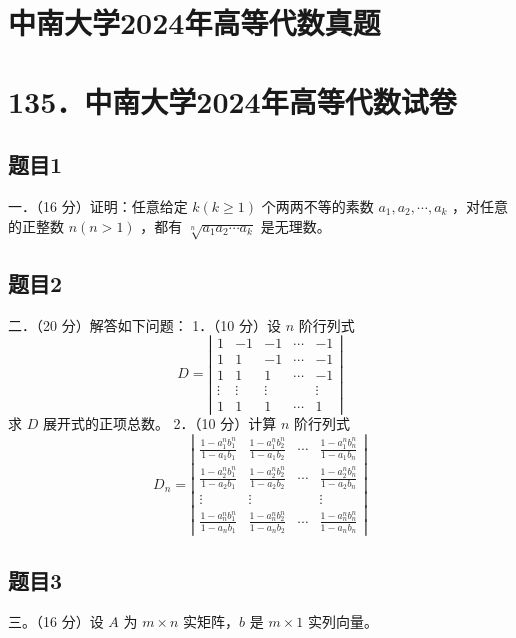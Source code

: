 \documentclass{article}
\begin{document}
\section*{中南大学2024年高等代数真题}
\section*{135．中南大学2024年高等代数试卷}

\subsection{题目1}
一．（16 分）证明：任意给定 \(k(k \geq 1)\) 个两两不等的素数 \(a_{1}, a_{2}, \cdots, a_{k}\) ，对任意的正整数 \(n(n>1)\) ，都有 \(\sqrt[n]{a_{1} a_{2} \cdots a_{k}}\) 是无理数。

\subsection{题目2}
二．（20 分）解答如下问题：
1．（10 分）设 \(n\) 阶行列式
\[
D=\left|\begin{array}{ccccc}
1 & -1 & -1 & \cdots & -1 \\
1 & 1 & -1 & \cdots & -1 \\
1 & 1 & 1 & \cdots & -1 \\
\vdots & \vdots & \vdots & & \vdots \\
1 & 1 & 1 & \cdots & 1
\end{array}\right|
\]
求 \(D\) 展开式的正项总数。
2．（10 分）计算 \(n\) 阶行列式
\[
D_{n}=\left|\begin{array}{cccc}
\frac{1-a_{1}^{n} b_{1}^{n}}{1-a_{1} b_{1}} & \frac{1-a_{1}^{n} b_{2}^{n}}{1-a_{1} b_{2}} & \cdots & \frac{1-a_{1}^{n} b_{n}^{n}}{1-a_{1} b_{n}} \\
\frac{1-a_{2}^{n} b_{1}^{n}}{1-a_{2} b_{1}} & \frac{1-a_{2}^{n} b_{2}^{n}}{1-a_{2} b_{2}} & \cdots & \frac{1-a_{2}^{n} b_{n}^{n}}{1-a_{2} b_{n}} \\
\vdots & \vdots & & \vdots \\
\frac{1-a_{n}^{n} b_{1}^{n}}{1-a_{n} b_{1}} & \frac{1-a_{n}^{n} b_{2}^{n}}{1-a_{n} b_{2}} & \cdots & \frac{1-a_{n}^{n} b_{n}^{n}}{1-a_{n} b_{n}}
\end{array}\right|
\]

\subsection{题目3}
三。（16 分）设 \(A\) 为 \(m \times n\) 实矩阵，\(b\) 是 \(m \times 1\) 实列向量。
\end{document}

